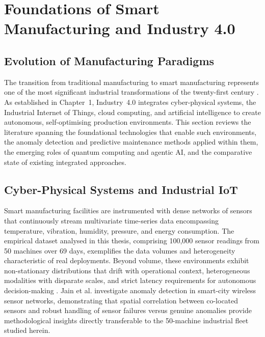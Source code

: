 \section{Foundations of Smart Manufacturing and Industry 4.0}



\subsection{Evolution of Manufacturing Paradigms}

The transition from traditional manufacturing to smart manufacturing represents one of the most significant industrial transformations of the twenty-first century \cite{mobley_introduction_2002, jardine_review_2006}. As established in Chapter~1, Industry~4.0 integrates cyber-physical systems, the Industrial Internet of Things, cloud computing, and artificial intelligence to create autonomous, self-optimising production environments. This section reviews the literature spanning the foundational technologies that enable such environments, the anomaly detection and predictive maintenance methods applied within them, the emerging roles of quantum computing and agentic AI, and the comparative state of existing integrated approaches.

\subsection{Cyber-Physical Systems and Industrial IoT}

Smart manufacturing facilities are instrumented with dense networks of sensors that continuously stream multivariate time-series data encompassing temperature, vibration, humidity, pressure, and energy consumption. The empirical dataset analysed in this thesis, comprising 100,000 sensor readings from 50 machines over 69 days, exemplifies the data volumes and heterogeneity characteristic of real deployments. Beyond volume, these environments exhibit non-stationary distributions that drift with operational context, heterogeneous modalities with disparate scales, and strict latency requirements for autonomous decision-making \cite{zhang_unsupervised_2021}. Jain et al. \cite{jain_anomaly_2016} investigate anomaly detection in smart-city wireless sensor networks, demonstrating that spatial correlation between co-located sensors and robust handling of sensor failures versus genuine anomalies provide methodological insights directly transferable to the 50-machine industrial fleet studied herein.

